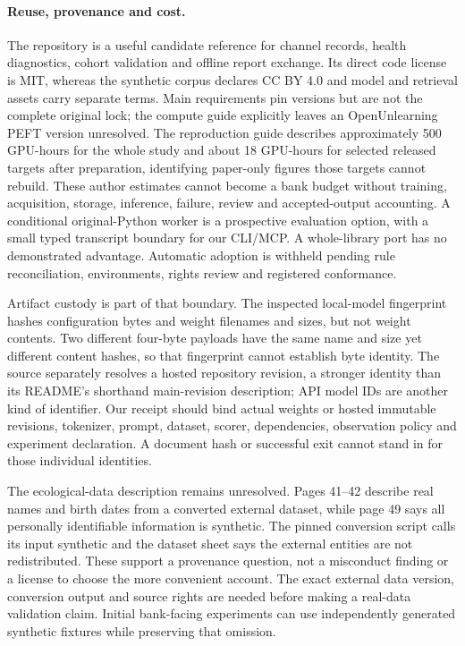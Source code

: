 \paragraph{Reuse, provenance and cost.}
The repository is a useful candidate reference for channel records, health
diagnostics, cohort validation and offline report exchange. Its direct code
license is MIT, whereas the synthetic corpus declares CC BY 4.0 and model and
retrieval assets carry separate terms. Main requirements pin versions but are
not the complete original lock; the compute guide explicitly leaves an
OpenUnlearning PEFT version unresolved. The reproduction guide describes
approximately 500 GPU-hours for the whole study and about 18 GPU-hours for
selected released targets after preparation, identifying paper-only figures
those targets cannot rebuild. These author estimates cannot become a bank
budget without training, acquisition, storage, inference, failure, review and
accepted-output accounting. A conditional original-Python worker is a prospective
evaluation option, with a small typed transcript boundary for our CLI/MCP.
A whole-library port has no demonstrated advantage. Automatic adoption is
withheld pending rule reconciliation, environments, rights review and registered
conformance.~\citep{exec24_unlearning_software}

Artifact custody is part of that boundary. The inspected local-model fingerprint
hashes configuration bytes and weight filenames and sizes, but not weight
contents. Two different four-byte payloads have the same name and size yet
different content hashes, so that fingerprint cannot establish byte identity.
The source separately resolves a hosted repository revision, a stronger identity
than its README's shorthand main-revision description; API model IDs are another
kind of identifier. Our receipt should bind actual weights or hosted immutable
revisions, tokenizer, prompt, dataset, scorer, dependencies, observation policy
and experiment declaration. A document hash or successful exit cannot stand in
for those individual identities.~\citep{exec24_unlearning_software,exec24_unlearning_reference}

The ecological-data description remains unresolved. Pages 41--42 describe real
names and birth dates from a converted external dataset, while page 49 says all
personally identifiable information is synthetic. The pinned conversion script
calls its input synthetic and the dataset sheet says the external entities are
not redistributed. These support a provenance question, not a misconduct finding
or a license to choose the more convenient account. The exact external data
version, conversion output and source rights are needed before making a
real-data validation claim. Initial bank-facing experiments can use independently
generated synthetic fixtures while preserving that omission.
\citep{exec24_unlearning_original,exec24_unlearning_software}

